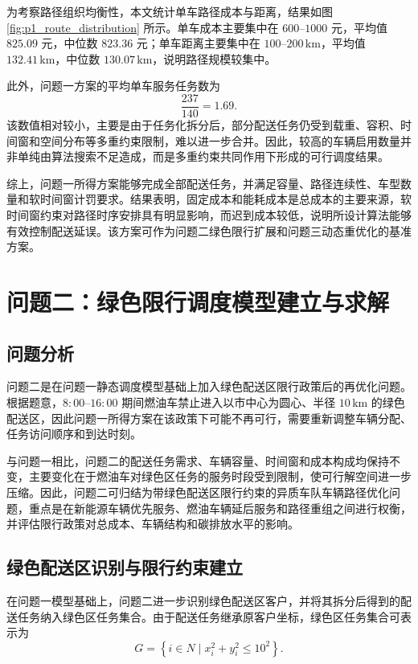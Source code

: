 \documentclass[withoutpreface,bwprint]{cumcmthesis} %
\begin{document}
为考察路径组织均衡性，本文统计单车路径成本与距离，结果如图 \ref{fig:p1_route_distribution} 所示。单车成本主要集中在 $600$--$1000$ 元，平均值 $825.09$ 元，中位数 $823.36$ 元；单车距离主要集中在 $100$--$200\,\mathrm{km}$，平均值 $132.41\,\mathrm{km}$，中位数 $130.07\,\mathrm{km}$，说明路径规模较集中。

此外，问题一方案的平均单车服务任务数为
\[
\frac{237}{140}=1.69.
\]
该数值相对较小，主要是由于任务化拆分后，部分配送任务仍受到载重、容积、时间窗和空间分布等多重约束限制，难以进一步合并。因此，较高的车辆启用数量并非单纯由算法搜索不足造成，而是多重约束共同作用下形成的可行调度结果。

综上，问题一所得方案能够完成全部配送任务，并满足容量、路径连续性、车型数量和软时间窗计罚要求。结果表明，固定成本和能耗成本是总成本的主要来源，软时间窗约束对路径时序安排具有明显影响，而迟到成本较低，说明所设计算法能够有效控制配送延误。该方案可作为问题二绿色限行扩展和问题三动态重优化的基准方案。


\section{问题二：绿色限行调度模型建立与求解}

\subsection{问题分析}

问题二是在问题一静态调度模型基础上加入绿色配送区限行政策后的再优化问题。根据题意，$8{:}00$--$16{:}00$ 期间燃油车禁止进入以市中心为圆心、半径 $10\,\mathrm{km}$ 的绿色配送区，因此问题一所得方案在该政策下可能不再可行，需要重新调整车辆分配、任务访问顺序和到达时刻。

与问题一相比，问题二的配送任务需求、车辆容量、时间窗和成本构成均保持不变，主要变化在于燃油车对绿色区任务的服务时段受到限制，使可行解空间进一步压缩。因此，问题二可归结为带绿色配送区限行约束的异质车队车辆路径优化问题，重点是在新能源车辆优先服务、燃油车辆延后服务和路径重组之间进行权衡，并评估限行政策对总成本、车辆结构和碳排放水平的影响\cite{lin2014,bektas2011,franceschetti2013}。

\subsection{绿色配送区识别与限行约束建立}

在问题一模型基础上，问题二进一步识别绿色配送区客户，并将其拆分后得到的配送任务纳入绿色区任务集合。由于配送任务继承原客户坐标，绿色区任务集合可表示为
\begin{equation}
G=\left\{i\in N\mid x_i^2+y_i^2\leq 10^2\right\}.
\label{eq:green_area_set}
\end{equation}
\end{document}
